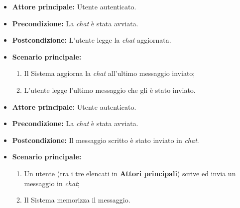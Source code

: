 \label{usecase:Lettura chat}
\begin{itemize}
	\item \textbf{Attore principale:} Utente autenticato.

	\item \textbf{Precondizione:} La \textit{chat} è stata avviata.
	
	\item \textbf{Postcondizione:} L'utente legge la \textit{chat} aggiornata.

	\item \textbf{Scenario principale:}
            \begin{enumerate}
                \item Il Sistema aggiorna la \textit{chat} all'ultimo messaggio inviato;
                \item L'utente legge l'ultimo messaggio che gli è stato inviato.
	      \end{enumerate}
\end{itemize}


\label{usecase:Invio messaggio chat}
\begin{itemize}
	\item \textbf{Attore principale:} Utente autenticato.

	\item \textbf{Precondizione:} La \textit{chat} è stata avviata.


	\item \textbf{Postcondizione:} Il messaggio scritto è stato inviato in \textit{chat}.

	\item \textbf{Scenario principale:}
            \begin{enumerate}
                \item Un utente (tra i tre elencati in \textbf{Attori principali}) scrive ed invia un messaggio in \textit{chat};
                \item Il Sistema memorizza il messaggio.
	      \end{enumerate}
\end{itemize}